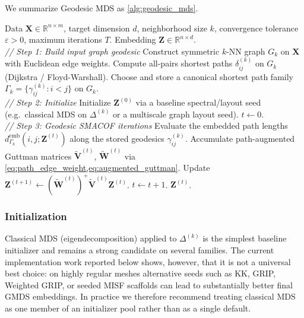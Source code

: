 \documentclass[11pt]{article}
\newcommand{\R}{\mathbb{R}}
\newcommand{\bX}{\mathbf{X}}
\newcommand{\bZ}{\mathbf{Z}}
\newcommand{\bV}{\mathbf{V}}
\newcommand{\bW}{\mathbf{W}}
\newcommand{\abs}[1]{\left|#1\right|}
\newcommand{\demb}{d^{\mathrm{emb}}}
\newcommand{\Gk}{G_k}
\begin{document}
We summarize Geodesic MDS as \cref{alg:geodesic_mds}.

\begin{algorithm}
\caption{Geodesic MDS}
\label{alg:geodesic_mds}
\begin{algorithmic}[1]
  \REQUIRE Data $\bX \in \R^{n \times m}$, target dimension $d$,
           neighborhood size $k$, convergence tolerance $\varepsilon > 0$,
           maximum iterations $T$.
  \ENSURE Embedding $\bZ \in \R^{n \times d}$.
  \\
  \textit{// Step 1: Build input graph geodesic}
  \STATE Construct symmetric $k$-NN graph $\Gk$ on $\bX$ with Euclidean
         edge weights.
  \STATE Compute all-pairs shortest paths $\delta^{(k)}_{ij}$ on $\Gk$
         (Dijkstra / Floyd-Warshall).
  \STATE Choose and store a canonical shortest path family
         $\Gamma_k = \{\gamma_{ij}^{(k)} : i < j\}$ on $\Gk$.
  \\
  \textit{// Step 2: Initialize}
  \STATE Initialize $\bZ^{(0)}$ via a baseline spectral/layout seed
         (e.g.\ classical MDS on $\Delta^{(k)}$ or a multiscale graph layout seed).
  \STATE $t \leftarrow 0$.
  \\
  \textit{// Step 3: Geodesic SMACOF iterations}
  \REPEAT
    \STATE Evaluate the embedded path lengths
           $\demb_{\Gamma_k}(i,j;\bZ^{(t)})$ along the stored geodesics
           $\gamma_{ij}^{(k)}$.
    \STATE Accumulate path-augmented Guttman matrices
           $\tilde{\bV}^{(t)}$, $\tilde{\bW}^{(t)}$ via \cref{eq:path_edge_weight,eq:augmented_guttman}.
    \STATE Update $\bZ^{(t+1)} \leftarrow (\tilde{\bW}^{(t)})^+ \tilde{\bV}^{(t)} \bZ^{(t)}$.
    \STATE $t \leftarrow t + 1$.
  \UNTIL{$\abs{\sigma^{\mathrm{geo}}(\bZ^{(t)}) - \sigma^{\mathrm{geo}}(\bZ^{(t-1)})} < \varepsilon$
         or $t \geq T$.}
  \RETURN $\bZ^{(t)}$.
\end{algorithmic}
\end{algorithm}

\subsubsection*{Initialization}
Classical MDS (eigendecomposition) applied to $\Delta^{(k)}$ is the simplest
baseline initializer and remains a strong candidate on several families.  The
current implementation work reported below shows, however, that it is not a
universal best choice: on highly regular meshes alternative seeds such as KK,
GRIP, Weighted GRIP, or seeded MISF scaffolds can lead to substantially better
final GMDS embeddings.  In practice we therefore recommend treating classical
MDS as one member of an initializer pool rather than as a single default.
\end{document}
